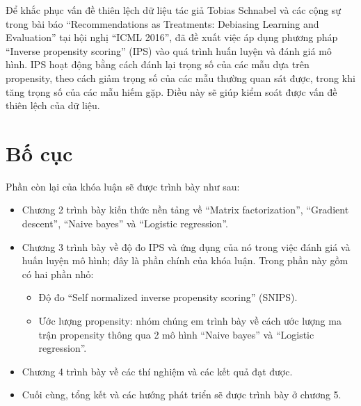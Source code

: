 Để khắc phục vấn đề thiên lệch dữ liệu tác giả Tobias Schnabel và các cộng sự \cite{IPS} trong bài báo ``Recommendations as Treatments: Debiasing Learning and Evaluation'' tại hội nghị ``ICML 2016'', đã đề xuất việc áp dụng phương pháp ``Inverse propensity scoring'' (IPS) vào quá trình huấn luyện và đánh giá mô hình. IPS hoạt động bằng cách đánh lại trọng số của các mẫu dựa trên propensity, theo cách giảm trọng số của các mẫu thường quan sát được, trong khi tăng trọng số của các mẫu hiếm gặp. Điều này sẽ giúp kiểm soát được vấn đề thiên lệch của dữ liệu.

\section{Bố cục}
Phần còn lại của khóa luận sẽ được trình bày như sau:
\begin{itemize}
    \item Chương 2 trình bày kiến thức nền tảng về ``Matrix factorization'', ``Gradient descent'', ``Naive bayes'' và ``Logistic regression''.
    \item Chương 3 trình bày về độ đo IPS và ứng dụng của nó trong việc đánh giá và huấn luyện mô hình; đây là phần chính của khóa luận. Trong phần này gồm có hai phần nhỏ:
    \begin{itemize}
        \item Độ đo ``Self normalized inverse propensity scoring'' (SNIPS). 
        \item Ước lượng propensity: nhóm chúng em trình bày về cách ước lượng ma trận propensity thông qua 2 mô hình ``Naive bayes'' và ``Logistic regression''.
    \end{itemize}
    \item Chương 4 trình bày về các thí nghiệm và các kết quả đạt được.
    \item Cuối cùng, tổng kết và các hướng phát triển sẽ được trình bày ở chương 5.
\end{itemize}
